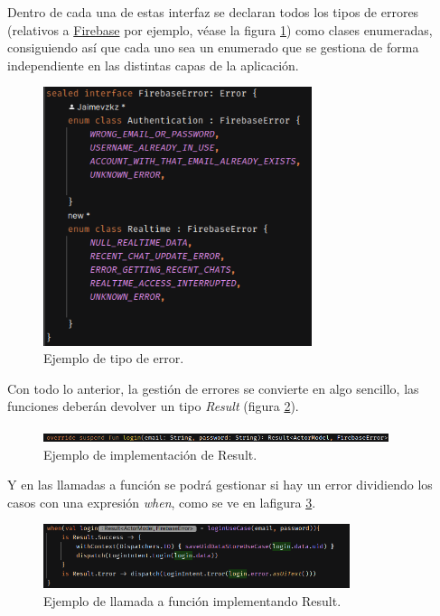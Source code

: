 Dentro de cada una de estas interfaz se declaran todos los tipos de errores (relativos a \hyperlink{subsec:firebase}{Firebase} por ejemplo, véase la figura \ref{fig:ejemplo_tipo_error}) como clases enumeradas, consiguiendo así que cada uno sea un enumerado que se gestiona de forma independiente en las distintas capas de la aplicación.
\begin{figure}[h]
    \centering
    \includegraphics[width = 0.7\textwidth]{Imagenes/Fuentes/ejemplo_tipo_error.png}
    \caption{Ejemplo de tipo de error.}
    \label{fig:ejemplo_tipo_error}
\end{figure}

Con todo lo anterior, la gestión de errores se convierte en algo sencillo, las funciones deberán devolver un tipo \textit{Result} (figura \ref{fig:ejemplo_impl_result}).
\begin{figure}[h]
    \centering
    \includegraphics[width = 0.9\textwidth]{Imagenes/Fuentes/ejemplo_impl_result.png}
    \caption{Ejemplo de implementación de Result.}
    \label{fig:ejemplo_impl_result}
\end{figure}

Y en las llamadas a función se podrá gestionar si hay un error dividiendo los casos con una expresión
\textit{when}\hyperlink{cap:biblio}{}, como se ve en lafigura \ref{fig:llamada_funcion_result}.
\begin{figure}[h]
    \centering
    \includegraphics[width = 0.8\textwidth]{Imagenes/Fuentes/llamada_funcion_result.png}
    \caption{Ejemplo de llamada a función implementando Result.}
    \label{fig:llamada_funcion_result}
\end{figure}